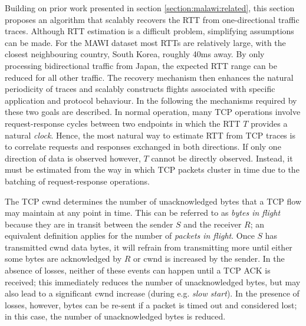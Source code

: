 Building on prior work presented in section \ref{section:malawi:related}, this section proposes an algorithm that scalably recovers the RTT from one-directional traffic traces. 
Although \ac{RTT} estimation is a difficult problem, simplifying assumptions can be made.
For the \acs{MAWI} dataset most \acp{RTT} are relatively large, with the closest neighbouring country, South Korea, roughly 40ms away.
By only processing bidirectional traffic from Japan, the expected \ac{RTT} range can be reduced for all other traffic.
The recovery mechanism then enhances the natural periodicity of traces and scalably constructs flights associated with specific application and protocol behaviour.
In the following the mechanisms required by these two goals are described. 
%
%
In normal operation, many \ac{TCP} operations involve request-response cycles between two endpoints in which the \ac{RTT} $T$ provides a natural \emph{clock}.
Hence, the most natural way to estimate \ac{RTT} from \ac{TCP} traces is to correlate requests and responses exchanged in both directions. 
If only one direction of data is observed however, $T$ cannot be directly observed. 
Instead, it must be estimated from the way in which \ac{TCP} packets cluster in time due to the batching of request-response operations.

The \ac{TCP} \ac{cwnd} determines the number of unacknowledged bytes that a \ac{TCP} flow may maintain at any point in time. 
This can be referred to as \emph{bytes in flight} because they are in transit between the sender $S$ and the receiver $R$; an equivalent definition applies for the number of \emph{packets in flight}. 
Once $S$ has transmitted \ac{cwnd} data bytes, it will refrain from transmitting more until either some bytes are acknowledged by $R$ or \ac{cwnd} is increased by the sender. 
In the absence of losses, neither of these events can happen until a \ac{TCP} \ac{ACK} is received; this immediately reduces the number of unacknowledged bytes, but may also lead to a significant \ac{cwnd} increase (during e.g. \emph{slow start}). 
In the presence of losses, however, bytes can be re-sent if a packet is timed out and considered lost; in this case, the number of unacknowledged bytes is reduced.


